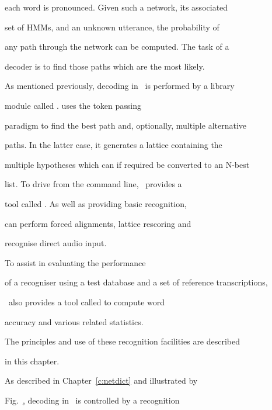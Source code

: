 each word is pronounced.  Given such a network, its associated


set of HMMs, and an unknown utterance,  the probability of


any path through the network can be computed.   The task of a 


decoder is to find those paths which are the most likely.





As mentioned previously, decoding in \HTK\ is performed by a library


module called .   uses the token passing


paradigm to find the best path and, optionally, multiple alternative


paths.  In the latter case, it generates a lattice containing the


multiple hypotheses which can if required be converted to an N-best


list.  To drive  from the command line, \HTK\ provides a


tool called .  As well as providing basic recognition,


 can perform forced alignments, lattice rescoring and


recognise direct audio input.  





To assist in evaluating the performance


of a recogniser using a test database and a set of reference transcriptions, 


\HTK\ also provides a tool called  to compute word 


accuracy and various related statistics.  


The principles and use of these recognition facilities are described


in this chapter.















As described in Chapter~\ref{c:netdict} and illustrated by


Fig.~\href{f:recsys}, decoding in \HTK\ is controlled by a recognition


